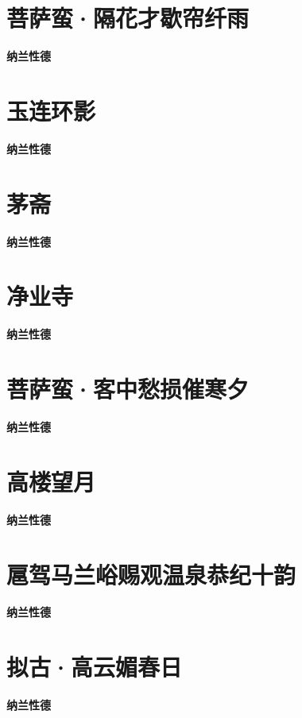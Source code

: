 \documentclass[12pt,a4paper]{ctexbook}
\begin{document}
\section{菩萨蛮·隔花才歇帘纤雨}
\textbf{纳兰性德}\par\vspace{0.5em}

\section{玉连环影}
\textbf{纳兰性德}\par\vspace{0.5em}

\section{茅斋}
\textbf{纳兰性德}\par\vspace{0.5em}

\section{净业寺}
\textbf{纳兰性德}\par\vspace{0.5em}

\section{菩萨蛮·客中愁损催寒夕}
\textbf{纳兰性德}\par\vspace{0.5em}

\section{高楼望月}
\textbf{纳兰性德}\par\vspace{0.5em}

\section{扈驾马兰峪赐观温泉恭纪十韵}
\textbf{纳兰性德}\par\vspace{0.5em}

\section{拟古·高云媚春日}
\textbf{纳兰性德}\par\vspace{0.5em}
\end{document}
